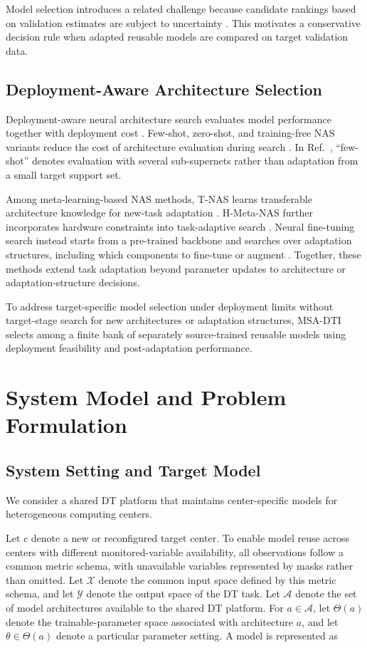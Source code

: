 \documentclass[a4paper,fleqn]{cas-sc}
\begin{document}
Model selection introduces a related challenge because candidate rankings
based on validation estimates are subject to uncertainty
\cite{ref33,ref34}. This motivates a conservative decision rule when adapted
reusable models are compared on target validation data.

\subsection{Deployment-Aware Architecture Selection}

Deployment-aware neural architecture search evaluates model performance
together with deployment cost \cite{ref12,ref13,ref26}. Few-shot, zero-shot,
and training-free NAS variants reduce the cost of architecture evaluation
during search \cite{ref14,ref15,ref16}. In Ref.~\cite{ref14}, ``few-shot''
denotes evaluation with several sub-supernets rather than adaptation from a
small target support set.

Among meta-learning-based NAS methods, T-NAS learns transferable architecture
knowledge for new-task adaptation \cite{ref31}. H-Meta-NAS further incorporates
hardware constraints into task-adaptive search \cite{ref30}. Neural
fine-tuning search instead starts from a pre-trained backbone and searches over
adaptation structures, including which components to fine-tune or augment
\cite{ref32}. Together, these methods extend task adaptation beyond parameter
updates to architecture or adaptation-structure decisions.

To address target-specific model selection under deployment limits without
target-stage search for new architectures or adaptation structures, MSA-DTI
selects among a finite bank of separately source-trained reusable models using
deployment feasibility and post-adaptation performance.

\section{System Model and Problem Formulation}
\label{sec:problem}

\subsection{System Setting and Target Model}

We consider a shared DT platform that maintains center-specific models for
heterogeneous computing centers.

Let $c$ denote a new or reconfigured target center. To enable model reuse
across centers with different monitored-variable availability, all observations
follow a common metric schema, with unavailable variables represented by masks
rather than omitted. Let $\mathcal{X}$ denote the common input space defined by
this metric schema, and let $\mathcal{Y}$ denote the output space of the DT
task. Let $\mathcal{A}$ denote the set of model architectures available to the
shared DT platform. For $a\in\mathcal{A}$, let $\Theta(a)$ denote the
trainable-parameter space associated with architecture $a$, and let
$\theta\in\Theta(a)$ denote a particular parameter setting. A model is
represented as
\end{document}
